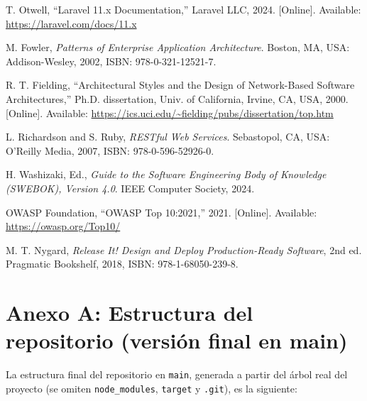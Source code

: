\documentclass[12pt,a4paper]{article}
\begin{document}
\begin{enumerate}[label={[\arabic*]}, leftmargin=1.2cm, itemsep=5pt]
\item \hypertarget{ieee1}{T. Otwell, ``Laravel 11.x Documentation,'' Laravel LLC, 2024. [Online]. Available: \url{https://laravel.com/docs/11.x}}
\item \hypertarget{ieee2}{M. Fowler, \textit{Patterns of Enterprise Application Architecture}. Boston, MA, USA: Addison-Wesley, 2002, ISBN: 978-0-321-12521-7.}
\item \hypertarget{ieee3}{R. T. Fielding, ``Architectural Styles and the Design of Network-Based Software Architectures,'' Ph.D. dissertation, Univ. of California, Irvine, CA, USA, 2000. [Online]. Available: \url{https://ics.uci.edu/~fielding/pubs/dissertation/top.htm}}
\item \hypertarget{ieee4}{L. Richardson and S. Ruby, \textit{RESTful Web Services}. Sebastopol, CA, USA: O'Reilly Media, 2007, ISBN: 978-0-596-52926-0.}
\item \hypertarget{ieee5}{H. Washizaki, Ed., \textit{Guide to the Software Engineering Body of Knowledge (SWEBOK), Version 4.0}. IEEE Computer Society, 2024.}
\item \hypertarget{ieee6}{OWASP Foundation, ``OWASP Top 10:2021,'' 2021. [Online]. Available: \url{https://owasp.org/Top10/}}
\item \hypertarget{ieee7}{M. T. Nygard, \textit{Release It! Design and Deploy Production-Ready Software}, 2nd ed. Pragmatic Bookshelf, 2018, ISBN: 978-1-68050-239-8.}
\end{enumerate}

\newpage

\section*{Anexo A: Estructura del repositorio (versión final en main)}

La estructura final del repositorio en \texttt{main}, generada a partir del árbol real del
proyecto (se omiten \texttt{node\_modules}, \texttt{target} y \texttt{.git}), es la
siguiente:
\end{document}
